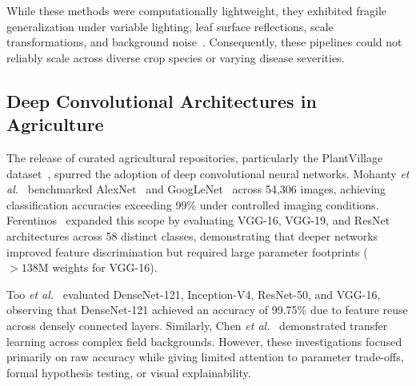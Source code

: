 \documentclass[journal]{IEEEtran}
\begin{document}
While these methods were computationally lightweight, they exhibited fragile generalization under variable lighting, leaf surface reflections, scale transformations, and background noise~\cite{barbedo2013}. Consequently, these pipelines could not reliably scale across diverse crop species or varying disease severities.

\subsection{Deep Convolutional Architectures in Agriculture}
The release of curated agricultural repositories, particularly the PlantVillage dataset~\cite{hughes2015}, spurred the adoption of deep convolutional neural networks. Mohanty \textit{et al.}~\cite{mohanty2016} benchmarked AlexNet~\cite{krizhevsky2012} and GoogLeNet~\cite{szegedy2015} across 54,306 images, achieving classification accuracies exceeding 99\% under controlled imaging conditions. Ferentinos~\cite{ferentinos2018} expanded this scope by evaluating VGG-16, VGG-19, and ResNet architectures across 58 distinct classes, demonstrating that deeper networks improved feature discrimination but required large parameter footprints ($>138\text{M}$ weights for VGG-16). 

Too \textit{et al.}~\cite{too2019} evaluated DenseNet-121, Inception-V4, ResNet-50, and VGG-16, observing that DenseNet-121 achieved an accuracy of 99.75\% due to feature reuse across densely connected layers. Similarly, Chen \textit{et al.}~\cite{chen2020} demonstrated transfer learning across complex field backgrounds. However, these investigations focused primarily on raw accuracy while giving limited attention to parameter trade-offs, formal hypothesis testing, or visual explainability.
\end{document}
